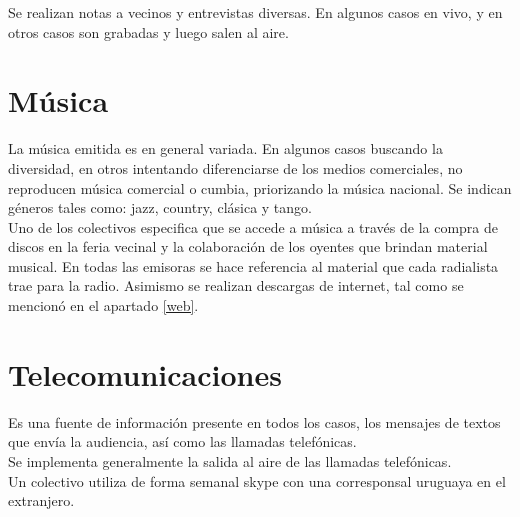 Se realizan notas a vecinos y entrevistas diversas. En algunos casos en vivo, y en otros casos son grabadas y luego salen al aire.

\section{Música}

La música emitida es en general variada. En algunos casos buscando la diversidad, en otros intentando diferenciarse de los medios comerciales, no reproducen música comercial o cumbia, priorizando la música nacional. Se indican géneros tales como: jazz, country, clásica y tango.\\

Uno de los colectivos especifica que se accede a música a través de la compra de discos en la feria vecinal y la colaboración de los oyentes que brindan material musical. En todas las emisoras se hace referencia al material que cada radialista trae para la radio. Asimismo se realizan descargas de internet, tal como se mencionó en el apartado \ref{web}.

\section{Telecomunicaciones}

Es una fuente de información presente en todos los casos, los mensajes de textos que envía la audiencia, así como las llamadas telefónicas.\\

Se implementa generalmente la salida al aire de las llamadas telefónicas.\\

Un colectivo utiliza de forma semanal skype con una corresponsal uruguaya en el extranjero.\\